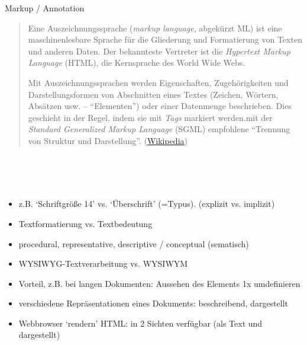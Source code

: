 \begin{frame}[allowframebreaks]{Markup / Annotation}
\\

\begin{quote}
Eine Auszeichnungssprache (\emph{markup language}, abgekürzt ML) ist eine maschinenlesbare Sprache für die Gliederung und Formatierung von Texten und anderen Daten. Der bekannteste Vertreter ist die \emph{Hypertext Markup Language} (HTML), die Kernsprache des World Wide Webs.

Mit Auszeichnungssprachen werden Eigenschaften, Zugehörigkeiten und Darstellungsformen von Abschnitten eines Textes (Zeichen, Wörtern, Absätzen usw. -- ``Elementen'') oder einer Datenmenge beschrieben. Dies geschieht in der Regel, indem sie mit \emph{Tags} markiert werden.\punkti mit der \emph{Standard Generalized Markup Language} (SGML) empfohlene ``Trennung von Struktur und Darstellung''. (\href{https://de.wikipedia.org/wiki/Auszeichnungssprache}{Wikipedia})
\end{quote}

\\
~ ~ ~  \\
 \\


\begin{itemize}
    \item z.B. `Schriftgröße 14' vs. `Überschrift' (=Typus). (explizit vs. implizit)
    \item Textformatierung vs. Textbedeutung
    \item procedural, representative, descriptive / conceptual (sematisch)
    \item WYSIWYG-Textverarbeitung  vs. WYSIWYM
    \item Vorteil, z.B. bei langen Dokumenten: Aussehen des Elements 1x umdefinieren
    \item verschiedene Repräsentationen eines Dokuments: beschreibend, dargestellt 
    \item Webbrowser `rendern' HTML: in 2 Sichten verfügbar (als Text und dargestellt)
\end{itemize}
\end{frame}
 
